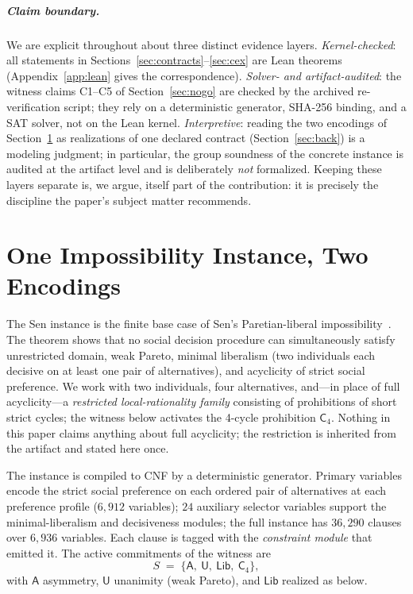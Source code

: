 \documentclass[sigplan,10pt,review,anonymous,nonacm]{acmart}
\theoremstyle{acmdefinition}
\newcommand{\modsym}[1]{\mathsf{#1}}
\begin{document}
\subparagraph*{Claim boundary.}
We are explicit throughout about three
distinct evidence layers. \emph{Kernel-checked}: all statements in
Sections~\ref{sec:contracts}--\ref{sec:cex} are Lean theorems
(Appendix~\ref{app:lean} gives the correspondence).
\emph{Solver- and artifact-audited}: the witness claims C1--C5 of
Section~\ref{sec:nogo} are checked by the archived re-verification script;
they rely on a deterministic generator, SHA-256 binding, and a SAT solver, not
on the Lean kernel. \emph{Interpretive}: reading the two encodings of
Section~\ref{sec:instance} as realizations of one declared contract
(Section~\ref{sec:back}) is a modeling judgment; in particular, the group
soundness of the concrete instance is audited at the artifact level and is
deliberately \emph{not} formalized. Keeping these layers separate is, we
argue, itself part of the contribution: it is precisely the discipline the
paper's subject matter recommends.

\section{One Impossibility Instance, Two Encodings}
\label{sec:instance}

The Sen instance is the finite base case of Sen's
Paretian-liberal impossibility~\cite{Sen1970}. The theorem shows that no social decision procedure can
simultaneously satisfy unrestricted domain, weak Pareto, minimal liberalism
(two individuals each decisive on at least one pair of alternatives), and
acyclicity of strict social preference. We work with two individuals, four
alternatives, and---in place of full acyclicity---a
\emph{restricted local-rationality family} consisting of prohibitions of
short strict cycles; the witness below activates the 4-cycle prohibition
$\mathsf{C}_4$. Nothing in this paper claims anything about full acyclicity;
the restriction is inherited from the artifact and stated here once.

The instance is compiled to CNF by a deterministic generator. Primary
variables encode the strict social preference on each ordered pair of
alternatives at each preference profile ($6{,}912$ variables); $24$ auxiliary
selector variables support the minimal-liberalism and decisiveness modules;
the full instance has
$36{,}290$ clauses over $6{,}936$ variables. Each clause is tagged with the
\emph{constraint module} that emitted it. The active commitments of the
witness are
\[
S \;=\; \{\modsym{A},\ \modsym{U},\ \mathsf{Lib},\ \mathsf{C}_4\},
\]
with $\modsym{A}$ asymmetry, $\modsym{U}$ unanimity (weak Pareto), and
$\mathsf{Lib}$ realized as below.
\end{document}
